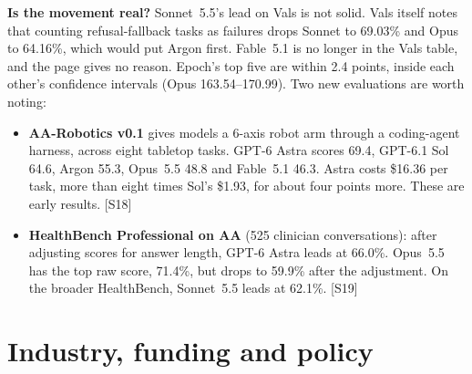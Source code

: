 \documentclass[11pt,a4paper]{article}
\newcommand{\srcref}[1]{\textcolor{brandaccent}{[S#1]}}
\begin{document}
\textbf{Is the movement real?} Sonnet~5.5's lead on Vals is not solid. Vals itself notes that counting
refusal-fallback tasks as failures drops Sonnet to 69.03\% and Opus to 64.16\%, which would put Argon first. Fable~5.1
is no longer in the Vals table, and the page gives no reason. Epoch's top five are within 2.4 points, inside each other's confidence
intervals (Opus 163.54--170.99). Two new evaluations are worth noting:

\begin{itemize}
  \item \textbf{AA-Robotics v0.1} gives models a 6-axis robot arm through a coding-agent harness, across eight tabletop tasks. GPT-6 Astra scores 69.4, GPT-6.1 Sol
  64.6, Argon 55.3, Opus~5.5 48.8 and Fable~5.1 46.3. Astra costs \$16.36 per task, more than eight times Sol's \$1.93, for about
  four points more. These are early results. \srcref{18}
  \item \textbf{HealthBench Professional on AA} (525 clinician conversations): after adjusting scores for answer length, GPT-6 Astra leads at 66.0\%.
  Opus~5.5 has the top raw score, 71.4\%, but drops to 59.9\% after the adjustment. On the broader HealthBench, Sonnet~5.5 leads at 62.1\%. \srcref{19}
\end{itemize}

\section{Industry, funding and policy}
\end{document}
